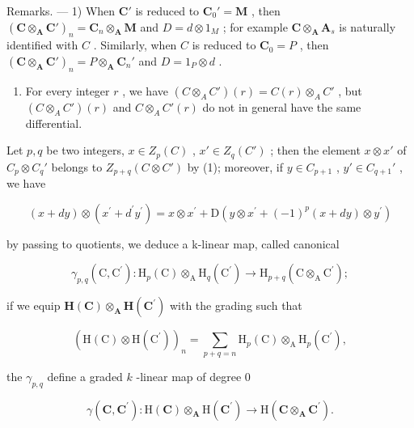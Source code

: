 Remarks. --- 1) When \(\mathbf{C}'\) is reduced to \(\mathbf{C}_0' = \mathbf{M}\) , then \((\mathbf{C} \otimes_{\mathbf{A}} \mathbf{C}')_n = \mathbf{C}_n \otimes_{\mathbf{A}} \mathbf{M}\) and \(D = d \otimes 1_M\) ; for example \(\mathbf{C} \otimes_{\mathbf{A}} \mathbf{A}_s\) is naturally identified with \(C\) . Similarly, when \(C\) is reduced to \(\mathbf{C}_0 = P\) , then \((\mathbf{C} \otimes_{\mathbf{A}} \mathbf{C}')_n = P \otimes_{\mathbf{A}} \mathbf{C}_n'\) and \(D = 1_P \otimes d\) .

\begin{enumerate}
\def\labelenumi{\arabic{enumi})}
\setcounter{enumi}{1}
\tightlist
\item
  For every integer \(r\) , we have \((C \otimes_{A} C')(r) = C(r) \otimes_{A} C'\) , but \((C \otimes_{A} C')(r)\) and \(C \otimes_{A} C'(r)\) do not in general have the same differential.
\end{enumerate}

Let \(p, q\) be two integers, \(x \in Z_p(C)\) , \(x' \in Z_q(C')\) ; then the element \(x \otimes x'\) of \(C_p \otimes C_q'\) belongs to \(Z_{p+q}(C \otimes C')\) by (1); moreover, if \(y \in C_{p+1}\) , \(y' \in C_{q+1}'\) , we have

\[
(x + d y) \otimes (x ^ {\prime} + d ^ {\prime} y ^ {\prime}) = x \otimes x ^ {\prime} + \mathrm{D} (y \otimes x ^ {\prime} + (- 1) ^ {p} (x + d y) \otimes y ^ {\prime})
\]

by passing to quotients, we deduce a k-linear map, called canonical

\[
\gamma_ {p, q} (\mathrm{C}, \mathrm{C} ^ {\prime}): \mathrm{H} _ {p} (\mathrm{C}) \otimes_ {\mathrm{A}} \mathrm{H} _ {q} (\mathrm{C} ^ {\prime}) \rightarrow \mathrm{H} _ {p + q} (\mathrm{C} \otimes_ {\mathrm{A}} \mathrm{C} ^ {\prime});
\]

if we equip \(\mathbf{H}(\mathbf{C})\otimes_{\mathbf{A}}\mathbf{H}(\mathbf{C}^{\prime})\) with the grading such that

\[
\left(\mathrm{H} (\mathrm{C}) \otimes \mathrm{H} (\mathrm{C} ^ {\prime})\right) _ {n} = \sum_ {p + q = n} \mathrm{H} _ {p} (\mathrm{C}) \otimes_ {\mathrm{A}} \mathrm{H} _ {p} (\mathrm{C} ^ {\prime}),
\]

the \(\gamma_{p,q}\) define a graded \(k\) -linear map of degree 0

\[
\gamma (\mathbf {C}, \mathbf {C} ^ {\prime}): \mathrm{H} (\mathbf {C}) \otimes_ {\mathbf {A}} \mathrm{H} (\mathbf {C} ^ {\prime}) \rightarrow \mathrm{H} (\mathbf {C} \otimes_ {\mathbf {A}} \mathbf {C} ^ {\prime}).
\]

